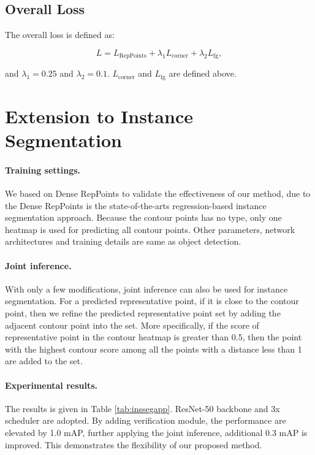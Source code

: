\documentclass{article}
\begin{document}
\subsection{Overall Loss}

The overall loss is defined as:

\begin{equation}
    L = L_\text{RepPoints} + \lambda_1 L_\text{corner} + \lambda_2 L_\text{fg},
\end{equation}

and $\lambda_1=0.25$ and $\lambda_2=0.1$. $L_\text{corner}$ and $L_\text{fg}$ are defined above.

\section{Extension to Instance Segmentation} \label{sec:insseg}

\paragraph{Training settings.} We based on Dense RepPoints \cite{yang19densereppts} to validate the effectiveness of our method, due to the Dense RepPoints is the state-of-the-arts regression-based instance segmentation approach. Because the contour points has no type, only one heatmap is used for predicting all contour points. Other parameters, network architectures and training details are same as object detection.

\paragraph{Joint inference.} With only a few modifications, joint inference can also be used for instance segmentation. For a predicted representative point, if it is close to the contour point, then we refine the predicted representative point set by adding the adjacent contour point into the set. More specifically, if the score of representative point in the contour heatmap is greater than 0.5, then the point with the highest contour score among all the points with a distance less than 1 are added to the set.

\paragraph{Experimental results.} The results is given in Table \ref{tab:inssegapp}. ResNet-50 backbone and 3x scheduler are adopted. By adding verification module, the performance are elevated by 1.0 mAP, further applying the joint inference, additional 0.3 mAP is improved. This demonstrates the flexibility of our proposed method.
\end{document}
